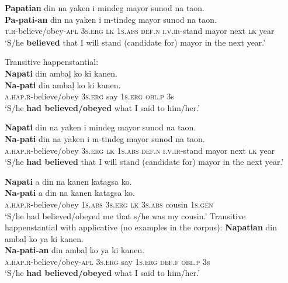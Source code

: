 \ea
\textbf{Papatian}   din  na  yaken  i  mindeg  mayor  sunod na  taon. \\\smallskip
\gll \textbf{Pa-pati-an}   din  na  yaken  i  m-tindeg  mayor  sunod na  taon. \\
\textsc{t.r}-believe/obey-\textsc{apl}  3\textsc{s.erg}  \textsc{lk}  1\textsc{s.abs}  \textsc{def.n}  \textsc{i.v.ir}-stand  mayor  next \textsc{lk}  year \\
\glt ‘S/he \textbf{believed} that I will stand (candidate for) mayor in the next year.’
\z

\ea
Transitive happenstantial: \\
\textbf{Napati}  din  ambaļ  ko  ki  kanen. \\\smallskip
\gll \textbf{Na-pati}  din  ambaļ  ko  ki  kanen. \\
\textsc{a.hap.r}-believe/obey  3\textsc{s.erg}  say  1\textsc{s.erg}  \textsc{obl.p}  3s \\
\glt ‘S/he \textbf{had believed/obeyed} what I said to him/her.’
\z


\ea
\textbf{Napati}  din  na  yaken  i  mindeg  mayor  sunod na  taon.\\\smallskip
\gll \textbf{Na-pati}  din  na  yaken  i  m-tindeg  mayor  sunod na  taon.\\
\textsc{a.hap.r}-believe/obey  3\textsc{s.erg}  \textsc{lk}  1\textsc{s.abs}  \textsc{def.n}  \textsc{i.v.ir}-stand  mayor  next
\textsc{lk}  year \\
\glt ‘S/he \textbf{had believed} that I will stand (candidate for) mayor in the next year.’
\z

\ea
\textbf{Napati}  a  din  na  kanen  katagsa  ko. \\\smallskip
\gll \textbf{Na-pati}  a  din  na  kanen  katagsa  ko. \\
\textsc{a.hap.r}-believe/obey  1\textsc{s.abs}  3\textsc{s.erg}  \textsc{lk}  3\textsc{s.abs}  cousin  1\textsc{s.gen} \\
\glt ‘S/he had believed/obeyed me that s/he was my cousin.’
\z
\newpage
\ea
Transitive happenstantial with applicative (no examples in the corpus):
\textbf{Napatian}  din  ambaļ  ko  ya  ki  kanen. \\\smallskip
\gll \textbf{Na-pati-an}  din  ambaļ  ko  ya  ki  kanen. \\
\textsc{a.hap.r}-believe/obey-\textsc{apl}  3\textsc{s.erg}  say  1\textsc{s.erg}  \textsc{def.f}  \textsc{obl.p}  3s \\
\glt ‘S/he \textbf{had believed/obeyed} what I said to him/her.’
\z

